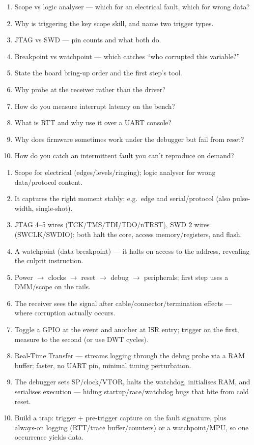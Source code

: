 \begin{scorecard}
\begin{enumerate}
\item Scope vs logic analyser --- which for an electrical fault, which for
  wrong data?
\item Why is triggering the key scope skill, and name two trigger types.
\item JTAG vs SWD --- pin counts and what both do.
\item Breakpoint vs watchpoint --- which catches ``who corrupted this
  variable?''
\item State the board bring-up order and the first step's tool.
\item Why probe at the receiver rather than the driver?
\item How do you measure interrupt latency on the bench?
\item What is RTT and why use it over a UART console?
\item Why does firmware sometimes work under the debugger but fail from reset?
\item How do you catch an intermittent fault you can't reproduce on demand?
\end{enumerate}
\end{scorecard}

\begin{answerkey}
\begin{enumerate}
\item Scope for electrical (edges/levels/ringing); logic analyser for wrong
  data/protocol content.
\item It captures the right moment stably; e.g.\ edge and serial/protocol (also
  pulse-width, single-shot).
\item JTAG 4--5 wires (TCK/TMS/TDI/TDO/nTRST), SWD 2 wires (SWCLK/SWDIO); both
  halt the core, access memory/registers, and flash.
\item A watchpoint (data breakpoint) --- it halts on access to the address,
  revealing the culprit instruction.
\item Power $\rightarrow$ clocks $\rightarrow$ reset $\rightarrow$ debug
  $\rightarrow$ peripherals; first step uses a DMM/scope on the rails.
\item The receiver sees the signal after cable/connector/termination effects ---
  where corruption actually occurs.
\item Toggle a GPIO at the event and another at ISR entry; trigger on the first,
  measure to the second (or use DWT cycles).
\item Real-Time Transfer --- streams logging through the debug probe via a RAM
  buffer; faster, no UART pin, minimal timing perturbation.
\item The debugger sets SP/clock/VTOR, halts the watchdog, initialises RAM, and
  serialises execution --- hiding startup/race/watchdog bugs that bite from cold
  reset.
\item Build a trap: trigger + pre-trigger capture on the fault signature, plus
  always-on logging (RTT/trace buffer/counters) or a watchpoint/MPU, so one
  occurrence yields data.
\end{enumerate}
\end{answerkey}

